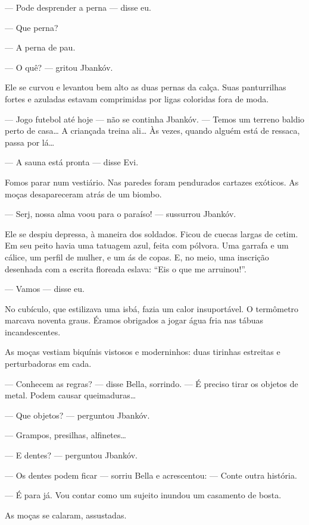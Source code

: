 --- Pode desprender a perna --- disse eu.

--- Que perna?

--- A perna de pau.

--- O quê? --- gritou Jbankóv.

Ele se curvou e levantou bem alto as duas pernas da calça. Suas
panturrilhas fortes e azuladas estavam comprimidas por ligas coloridas
fora de moda.

--- Jogo futebol até hoje --- não se continha Jbankóv.
--- Temos um terreno baldio perto de casa\ldots{} A criançada treina
ali\ldots{} Às vezes, quando alguém está de ressaca, passa por lá\ldots{}

--- A sauna está pronta --- disse Evi.

Fomos parar num vestiário. Nas paredes foram pendurados cartazes
exóticos. As moças desapareceram atrás de um biombo.

--- Serj, nossa alma voou para o paraíso! --- sussurrou
Jbankóv.

Ele se despiu depressa, à maneira dos soldados. Ficou de cuecas largas
de cetim. Em seu peito havia uma tatuagem azul, feita com pólvora. Uma
garrafa e um cálice, um perfil de mulher, e um ás de copas. E, no meio,
uma inscrição desenhada com a escrita floreada eslava: ``Eis o que me
arruinou!''.

--- Vamos --- disse eu.

No cubículo, que estilizava uma isbá, fazia um calor insuportável. O
termômetro marcava noventa graus. Éramos obrigados a jogar água fria nas
tábuas incandescentes.

As moças vestiam biquínis vistosos e moderninhos: duas tirinhas
estreitas e perturbadoras em cada.

--- Conhecem as regras? --- disse Bella, sorrindo.
--- É preciso tirar os objetos de metal. Podem causar
queimaduras\ldots{}

--- Que objetos? --- perguntou Jbankóv.

--- Grampos, presilhas, alfinetes\ldots{}

--- E dentes? --- perguntou Jbankóv.

--- Os dentes podem ficar --- sorriu Bella e acrescentou:
--- Conte outra história.

--- É para já. Vou contar como um sujeito inundou um casamento de
bosta.

As moças se calaram, assustadas.

